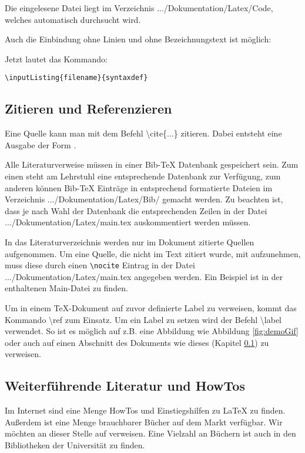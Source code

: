 Die eingelesene Datei liegt im Verzeichnis
.../Dokumentation/Latex/Code, welches automatisch durchsucht wird. 

Auch die Einbindung ohne Linien und ohne Bezeichnungstext ist möglich:


Jetzt lautet das Kommando:

\begin{verbatim}
\inputListing{filename}{syntaxdef}
\end{verbatim}


\subsection{Zitieren und Referenzieren}
\label{subsec:zitieren}
Eine Quelle kann man mit dem Befehl \textbackslash cite\{...\}
zitieren. Dabei entsteht eine Ausgabe der Form \cite{han99a}.

Alle Literaturverweise müssen in einer Bib-TeX Datenbank gespeichert
sein. Zum einen steht am Lehrstuhl eine entsprechende Datenbank zur
Verfügung, zum anderen können Bib-TeX Einträge in entsprechend
formatierte Dateien im Verzeichnis .../Dokumentation/Latex/Bib/
gemacht werden. Zu beachten ist, dass je nach Wahl der Datenbank die
entsprechenden Zeilen in der Datei .../Dokumentation/Latex/main.tex
auskommentiert werden müssen.

In das Literaturverzeichnis werden nur im Dokument zitierte Quellen
auf\-ge\-nom\-men. Um eine Quelle, die nicht im Text zitiert wurde, mit
auf\-zu\-neh\-men, muss diese durch einen \texttt{\textbackslash nocite}
Eintrag in der Datei .../Dokumentation/Latex/main.tex angegeben
werden. Ein Beispiel ist in der enthaltenen Main-Datei zu finden.

Um in einem TeX-Dokument auf zuvor definierte Label zu verweisen,
kommt das Kommando \textbackslash ref zum Einsatz. Um ein Label zu
setzen wird der Befehl \textbackslash label verwendet. So ist es
möglich auf z.B. eine Abbildung wie Abbildung \ref{fig:demoGif} oder
auch auf einen Abschnitt des Dokuments wie dieses (Kapitel
\ref{subsec:zitieren}) zu verweisen.


\subsection{Weiterführende Literatur und HowTos}
\label{subsec:howto}
Im Internet sind eine Menge HowTos und Einstiegshilfen zu \LaTeX \index{\LaTeX}
zu finden. Außerdem ist eine Menge brauchbarer Bücher auf dem Markt
verfügbar. Wir möchten an dieser Stelle auf \cite{kop02} \cite{gms00}
verweisen. Eine Vielzahl an Büchern ist auch in den Bibliotheken der
Universität zu finden.



